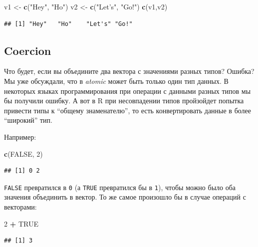 \documentclass[]{book}
\newenvironment{Shaded}{\begin{snugshade}}{\end{snugshade}}
\newcommand{\DecValTok}[1]{\textcolor[rgb]{0.00,0.00,0.81}{#1}}
\newcommand{\KeywordTok}[1]{\textcolor[rgb]{0.13,0.29,0.53}{\textbf{#1}}}
\newcommand{\NormalTok}[1]{#1}
\newcommand{\OperatorTok}[1]{\textcolor[rgb]{0.81,0.36,0.00}{\textbf{#1}}}
\newcommand{\OtherTok}[1]{\textcolor[rgb]{0.56,0.35,0.01}{#1}}
\newcommand{\StringTok}[1]{\textcolor[rgb]{0.31,0.60,0.02}{#1}}
\begin{document}
\begin{Shaded}
\begin{Highlighting}[]
\NormalTok{v1 <-}\StringTok{ }\KeywordTok{c}\NormalTok{(}\StringTok{"Hey"}\NormalTok{, }\StringTok{"Ho"}\NormalTok{)}
\NormalTok{v2 <-}\StringTok{ }\KeywordTok{c}\NormalTok{(}\StringTok{"Let's"}\NormalTok{, }\StringTok{"Go!"}\NormalTok{)}
\KeywordTok{c}\NormalTok{(v1,v2)}
\end{Highlighting}
\end{Shaded}

\begin{verbatim}
## [1] "Hey"   "Ho"    "Let's" "Go!"
\end{verbatim}

\hypertarget{coercion}{%
\subsection{Coercion}\label{coercion}}

Что будет, если вы объедините два вектора с значениями разных типов? Ошибка?
Мы уже обсуждали, что в \emph{atomic} может быть только один тип данных. В некоторых языках программирования при операции с данными разных типов мы бы получили ошибку. А вот в R при несовпадении типов пройзойдет попытка привести типы к ``общему знаменателю'', то есть конвертировать данные в более ``широкий'' тип.

Например:

\begin{Shaded}
\begin{Highlighting}[]
\KeywordTok{c}\NormalTok{(}\OtherTok{FALSE}\NormalTok{, }\DecValTok{2}\NormalTok{)}
\end{Highlighting}
\end{Shaded}

\begin{verbatim}
## [1] 0 2
\end{verbatim}

\texttt{FALSE} превратился в \texttt{0} (а \texttt{TRUE} превратился бы в \texttt{1}), чтобы можно было оба значения объединить в вектор. То же самое произошло бы в случае операций с векторами:

\begin{Shaded}
\begin{Highlighting}[]
\DecValTok{2} \OperatorTok{+}\StringTok{ }\OtherTok{TRUE}
\end{Highlighting}
\end{Shaded}

\begin{verbatim}
## [1] 3
\end{verbatim}
\end{document}
